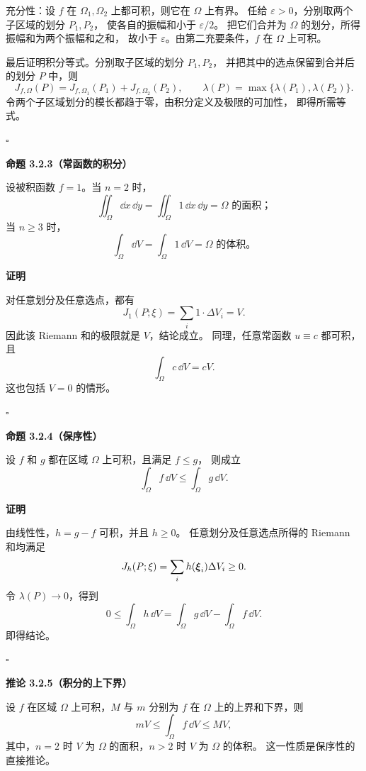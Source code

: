 充分性：设 $f$ 在 $\Omega_1,\Omega_2$ 上都可积，则它在 $\Omega$ 上有界。
任给 $\varepsilon>0$，分别取两个子区域的划分 $P_1,P_2$，
使各自的振幅和小于 $\varepsilon/2$。
把它们合并为 $\Omega$ 的划分，所得振幅和为两个振幅和之和，
故小于 $\varepsilon$。由第二充要条件，$f$ 在 $\Omega$ 上可积。

最后证明积分等式。分别取子区域的划分 $P_1,P_2$，
并把其中的选点保留到合并后的划分 $P$ 中，则
\[
J_{f,\Omega}(P)
=J_{f,\Omega_1}(P_1)+J_{f,\Omega_2}(P_2),
\qquad
\lambda(P)=\max\{\lambda(P_1),\lambda(P_2)\}.
\]
令两个子区域划分的模长都趋于零，由积分定义及极限的可加性，
即得所需等式。


$\square$





\textbf{命题 3.2.3（常函数的积分）}


设被积函数 $f=1$。当 $n=2$ 时，
\[
\iint_\Omega\dd x\,\dd y
=\iint_\Omega1\,\dd x\,\dd y
=\Omega\text{ 的面积；}
\]
当 $n\ge3$ 时，
\[
\int_\Omega\dd V=\int_\Omega1\,\dd V
=\Omega\text{ 的体积。}
\]





\textbf{证明}

对任意划分及任意选点，都有
\[
J_1(P;\xi)=\sum_i1\cdot\Delta V_i=V.
\]
因此该 Riemann 和的极限就是 $V$，结论成立。
同理，任意常函数 $u\equiv c$ 都可积，且
\[
\int_\Omega c\,\dd V=cV.
\]
这也包括 $V=0$ 的情形。


$\square$





\textbf{命题 3.2.4（保序性）}


设 $f$ 和 $g$ 都在区域 $\Omega$ 上可积，且满足 $f\le g$，
则成立
\[
\int_\Omega f\,\dd V\le\int_\Omega g\,\dd V.
\]





\textbf{证明}

由线性性，$h=g-f$ 可积，并且 $h\ge0$。
任意划分及任意选点所得的 Riemann 和均满足
\[
J_h(P;\xi)=\sum_i h(\boldsymbol{\xi}_i)\Delta V_i\ge0.
\]
令 $\lambda(P)\to0$，得到
\[
0\le\int_\Omega h\,\dd V
=\int_\Omega g\,\dd V-\int_\Omega f\,\dd V.
\]
即得结论。


$\square$




\textbf{推论 3.2.5（积分的上下界）}


	设 $f$ 在区域 $\Omega$ 上可积，$M$ 与 $m$ 分别为 $f$ 在 $\Omega$
	上的上界和下界，则
	\[
	mV\le\int_\Omega f\,\dd V\le MV,
	\]
	其中，$n=2$ 时 $V$ 为 $\Omega$ 的面积，$n>2$ 时 $V$ 为 $\Omega$ 的体积。
	这一性质是保序性的直接推论。







